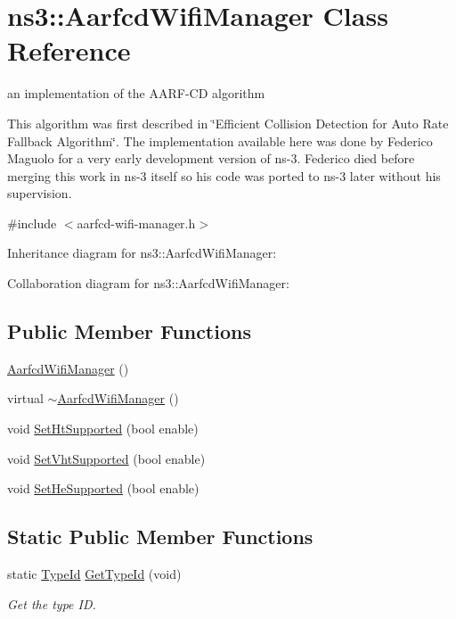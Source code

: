 \hypertarget{classns3_1_1AarfcdWifiManager}{}\section{ns3\+:\+:Aarfcd\+Wifi\+Manager Class Reference}
\label{classns3_1_1AarfcdWifiManager}


an implementation of the A\+A\+R\+F-\/\+CD algorithm

This algorithm was first described in \char`\"{}\+Efficient Collision Detection for Auto Rate Fallback Algorithm\char`\"{}. The implementation available here was done by Federico Maguolo for a very early development version of ns-\/3. Federico died before merging this work in ns-\/3 itself so his code was ported to ns-\/3 later without his supervision.  




{\ttfamily \#include $<$aarfcd-\/wifi-\/manager.\+h$>$}



Inheritance diagram for ns3\+:\+:Aarfcd\+Wifi\+Manager\+:


Collaboration diagram for ns3\+:\+:Aarfcd\+Wifi\+Manager\+:
\subsection*{Public Member Functions}
\begin{DoxyCompactItemize}
\item 
\hyperlink{classns3_1_1AarfcdWifiManager_a2af8a96ab6ea9ee36beff236c71e346f}{Aarfcd\+Wifi\+Manager} ()
\item 
virtual \hyperlink{classns3_1_1AarfcdWifiManager_ad3b147994cef0b62df5e27197837b764}{$\sim$\+Aarfcd\+Wifi\+Manager} ()
\item 
void \hyperlink{classns3_1_1AarfcdWifiManager_af4a08aa52eca3417d54dc7e69828c855}{Set\+Ht\+Supported} (bool enable)
\item 
void \hyperlink{classns3_1_1AarfcdWifiManager_a71eeb18e0b0684c963616bbc3507cb78}{Set\+Vht\+Supported} (bool enable)
\item 
void \hyperlink{classns3_1_1AarfcdWifiManager_afc865967cd1e64dd92fd3b617e830f22}{Set\+He\+Supported} (bool enable)
\end{DoxyCompactItemize}
\subsection*{Static Public Member Functions}
\begin{DoxyCompactItemize}
\item 
static \hyperlink{classns3_1_1TypeId}{Type\+Id} \hyperlink{classns3_1_1AarfcdWifiManager_aba2dcdcbfbc48ba506ad70f80f84cc9b}{Get\+Type\+Id} (void)
\begin{DoxyCompactList}\small\item\em Get the type ID. \end{DoxyCompactList}\end{DoxyCompactItemize}

